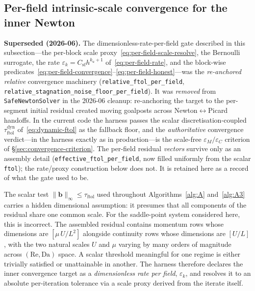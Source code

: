 \documentclass{article}
\newcommand{\code}[1]{\texttt{\small #1}}
\newcommand{\textftol}{\tau_{\mathrm{ftol}}}
\newcommand{\extline}[1]{{\color{extcolor}#1}}
\begin{document}
\subsection{Per-field intrinsic-scale convergence for the inner Newton}
\label{sec:harness-perfield}

\begin{tcolorbox}[colback=red!4!white, colframe=red!55!black, boxrule=0.5pt, arc=2pt, left=6pt, right=6pt, top=4pt, bottom=4pt]
\small
\textbf{Superseded (2026-06).} The dimensionless-rate-per-field gate described in
this subsection---the per-block scale proxy~\eqref{eq:per-field-scale-resolve}, the
Bernoulli surrogate, the rate $\varepsilon_k=C_{\mathrm{sf}}h^{k_u+1}$
of~\eqref{eq:per-field-rate}, and the block-wise
predicates~\eqref{eq:per-field-convergence}--\eqref{eq:per-field-honest}---was the
\emph{re-anchored relative} convergence machinery (\code{relative\_ftol\_per\_field},
\code{relative\_stagnation\_noise\_floor\_per\_field}). It was \emph{removed} from
\code{SafeNewtonSolver} in the 2026-06 cleanup: re-anchoring the target to the
per-segment initial residual created moving goalposts across
Newton$\leftrightarrow$Picard handoffs. In the current code the harness passes the
scalar discretisation-coupled $\textftol^{\mathrm{dyn}}$ of~\eqref{eq:dynamic-ftol}
as the fallback floor, and the \emph{authoritative} convergence verdict---in the
harness exactly as in production---is the scale-free $\varepsilon_M/\varepsilon_C$
criterion of §\ref{sec:convergence-criterion}. The per-field residual \emph{vectors}
survive only as an assembly detail (\code{effective\_ftol\_per\_field}, now filled
uniformly from the scalar \code{ftol}); the rate/proxy construction below does not.
It is retained here as a record of what the gate used to be.
\end{tcolorbox}

\extline{The scalar test $\|\boldsymbol{b}\|_\infty \le \textftol$ used
throughout Algorithms~\ref{alg:A} and~\ref{alg:A3} carries a hidden
dimensional assumption: it presumes that all components of the
residual share one common scale. For the saddle-point system
considered here, this is incorrect. The assembled residual contains
momentum rows whose dimensions are $[\mu\, U / L^{2}]$ alongside
continuity rows whose dimensions are $[U/L]$, with the two natural
scales $U$ and $\mu$ varying by many orders of magnitude across
$(\mathrm{Re}, \mathrm{Da})$ space. A scalar threshold meaningful for
one regime is either trivially satisfied or unattainable in another.
The harness therefore declares the inner convergence target as a
\emph{dimensionless rate per field}, $\varepsilon_{k}$, and resolves
it to an absolute per-iteration tolerance via a scale proxy derived
from the iterate itself.}
\end{document}
